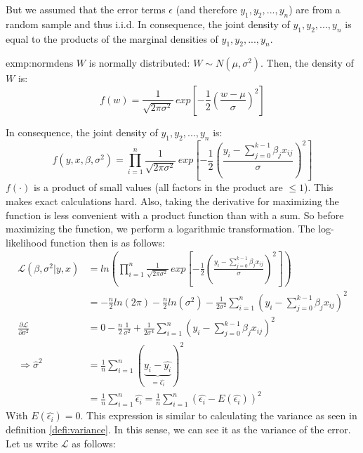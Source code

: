 	But we assumed that the error terms $\epsilon$ (and therefore $y_1,y_2,...,y_n$) are from a random sample and thus i.i.d. In consequence, the joint density of $y_1,y_2,...,y_n$ is equal to the products of the marginal densities of $y_1,y_2,...,y_n$.
	\begin{exmp}{exmp:normdens}
		$W$ is normally distributed: $W\sim N(\mu,\sigma^2)$. Then, the density of $W$ is:
		\begin{equation*}
			f(w)=\frac{1}{\sqrt{2\pi\sigma^2}}\,exp\left[-\frac{1}{2}\left(\frac{w-\mu}{\sigma}\right)^2\right]
		\end{equation*}
	\end{exmp}
	In consequence, the joint density of $y_1,y_2,...,y_n$ is:
	\begin{equation*}
		f(y,x,\beta,\sigma^2)=\prod_{i=1}^{n}\frac{1}{\sqrt{2\pi\sigma^2}}\,exp\left[-\frac{1}{2}\left(\frac{y_i-\sum\limits_{j=0}^{k-1}\beta_j x_{ij}}{\sigma}\right)^2\right]
	\end{equation*}
	$f(\cdot)$ is a product of small values (all factors in the product are $\leq 1$). This makes exact calculations hard. Also, taking the derivative for maximizing the function is less convenient with a product function than with a sum. So before maximizing the function, we perform a logarithmic transformation. The log-likelihood function then is as follows:
	\begin{align*}
		\mathcal{L}(\beta,\sigma^2|y,x)&=ln\left(\prod_{i=1}^{n}\frac{1}{\sqrt{2\pi\sigma^2}}\,exp\left[-\frac{1}{2}\left(\frac{y_i-\sum\limits_{j=0}^{k-1}\beta_j x_{ij}}{\sigma}\right)^2\right]\right)\\
		&=-\frac{n}{2}ln(2\pi)-\frac{n}{2}ln(\sigma^2)-\frac{1}{2\sigma^2}\sum\limits_{i=1}^n\left(y_i-\sum\limits_{j=0}^{k-1}\beta_j x_{ij}\right)^2\\
		\frac{\partial\mathcal{L}}{\partial\sigma^2}&=0-\frac{n}{2}\frac{1}{\sigma^2}+\frac{1}{2\sigma^4}\sum\limits^n_{i=1}\left(y_i-\sum\limits_{j=0}^{k-1}\beta_j x_{ij}\right)^2\\
		\Longrightarrow \hat{\sigma}^2&=\frac{1}{n}\sum\limits_{i=1}^n(			\underbrace{y_i-\hat{y_i}}_{=\hat{\epsilon_i}})^2\\
		&=\frac{1}{n}\sum\limits_{i=1}^n \hat{\epsilon_i}=\frac{1}{n}\sum\limits_{i=1}^n \left(\hat{\epsilon_i}-E(\hat{\epsilon_i})\right)^2
	\end{align*}
	With $E(\hat{\epsilon_i})=0$. This expression is similar to calculating the variance as seen in definition \ref{defi:variance}. In this sense, we can see it as the variance of the error. Let us write $\mathcal{L}$ as follows:
